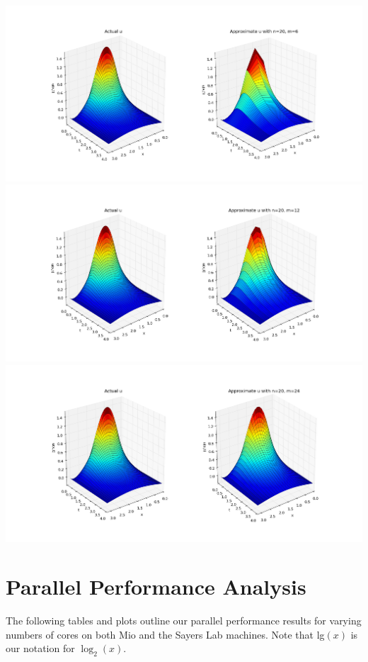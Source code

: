 \documentclass[letterpaper, 12pt]{article}
\begin{document}
	\includegraphics[trim = 6.5cm 3cm 6cm 2cm, width=\linewidth]{ProjectFiles/results/plots/n20m6.png} \\\vspace{2cm}
	\includegraphics[trim = 6.5cm 3cm 6cm 2cm, width=\linewidth]{ProjectFiles/results/plots/n20m12.png} \\\vspace{2cm}
	\includegraphics[trim = 6.5cm 3cm 6cm 2cm, width=\linewidth]{ProjectFiles/results/plots/n20m24.png} 
	
	\section*{Parallel Performance Analysis}
	The following tables and plots outline our parallel performance results for varying numbers of cores on both Mio and the Sayers Lab machines. Note that lg$(x)$ is our notation for $\log_2(x)$.
	
\end{document}
